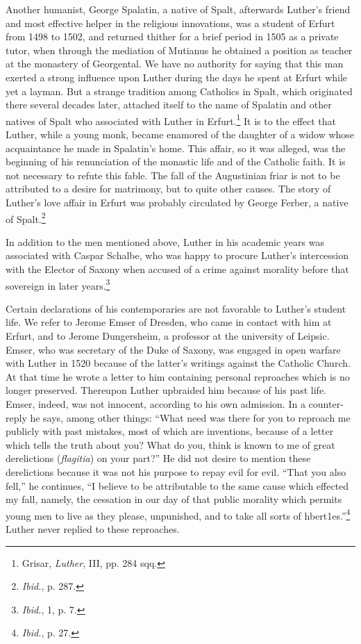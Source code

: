 Another humanist, George Spalatin, a native of Spalt, afterwards
Luther’s friend and most effective helper in the religious innovations,
was a student of Erfurt from 1498 to 1502, and returned thither
for a brief period in 1505 as a private tutor, when through the
mediation of Mutianus he obtained a position as teacher at the
monastery of Georgental. We have no authority for saying that this
man exerted a strong influence upon Luther during the days
he spent at Erfurt while yet a layman. But a strange tradition among
Catholics in Spalt, which originated there several decades later, attached
itself to the name of Spalatin and other natives of Spalt who
associated with Luther in Erfurt.\footnote{Grisar, \textit{Luther}, III, pp. 284 sqq.}
It is to the effect that Luther,
while a young monk, became enamored of the daughter of a widow
whose acquaintance he made in Spalatin’s home. This affair, so it was
alleged, was the beginning of his renunciation of the monastic life
and of the Catholic faith. It is not necessary to refute this fable.
The fall of the Augustinian friar is not to be attributed to a desire
for matrimony, but to quite other causes. The story of Luther’s love
affair in Erfurt was probably circulated by George Ferber, a native
of Spalt.\footnote{\textit{Ibid.}, p. 287.}

In addition to the men mentioned above, Luther in his academic
years was associated with Caspar Schalbe, who was happy to procure
Luther’s intercession with the Elector of Saxony when accused of
a crime against morality before that sovereign in later years.\footnote{\textit{Ibid.}, 1, p. 7.}

Certain declarations of his contemporaries are not favorable to
Luther’s student life. We refer to Jerome Emser of Dresden, who
came in contact with him at Erfurt, and to Jerome Dungersheim, a
professor at the university of Leipsic. Emser, who was secretary of the
Duke of Saxony, was engaged in open warfare with Luther in 1520
because of the latter’s writings against the Catholic Church. At that
time he wrote a letter to him containing personal reproaches which
is no longer preserved. Thereupon Luther upbraided him because
of his past life. Emser, indeed, was not innocent, according to his own
admission. In a counter-reply he says, among other things: “What
need was there for you to reproach me publicly with past mistakes,
most of which are inventions, because of a letter which tells the truth
about you? What do you, think is known to me of great derelictions
(\textit{flagitia}) on your part?” He did not desire to mention these derelictions
because it was not his purpose to repay evil for evil. “That
you also fell,” he continues, “I believe to be attributable to the same
cause which effected my fall, namely, the cessation in our day of that
public morality which permits young men to live as they please,
unpunished, and to take all sorts of hbert1es.”\footnote{\textit{Ibid.}, p. 27.}
Luther never replied to these reproaches.

